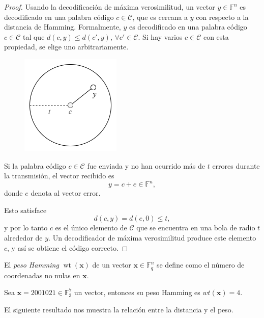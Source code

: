 \begin{proof}
    Usando la decodificación de máxima verosimilitud, un vector $y \in \mathbb{F}^n$ es decodificado en una palabra código $c  \in \mathcal{C}$, que es cercana a $y$ con respecto a la distancia de Hamming. Formalmente, $y$ es decodificado en una palabra código $c \in \mathcal{C}$ tal que $d(c,y) \leq d(c',y)$, $\forall c' \in \mathcal{C}$. Si hay varios $c \in \mathcal{C}$ con esta propiedad, se elige uno arbitrariamente.

    \begin{figure}
        \centering
        \includegraphics[scale=0.5]{figures/Diagrama_decodificacion_maxima_verosimilitud.png}
    \end{figure}

    Si la palabra código $c \in \mathcal{C}$ fue enviada y no han ocurrido más de $t$ errores durante la transmisión, el vector recibido es 
    \[
        y = c + e \in \mathbb{F}^n,
    \]
    donde $e$ denota al vector error.
    
    Esto satisface 
    \[
        d(c,y) = d(e,0) \leq t,
    \]
    y por lo tanto $c$ es el único elemento de $\mathcal{C}$ que se encuentra en una bola de radio $t$ alrededor de $y$. Un decodificador de máxima verosimilitud produce este elemento $c$, y así se obtiene el código correcto.
\end{proof}

\begin{definition}
    El \emph{peso Hamming} $\operatorname{wt}(\mathbf{x})$ de un vector $\mathbf{x} \in \mathbb{F}_q^n$ se define como el número de coordenadas no nulas en $\mathbf{x}$.
\end{definition}

\begin{exampleth}
    Sea $\mathbf{x} = 2001021 \in \mathbb{F}_3^7$ un vector, entonces su peso Hamming es $wt(\mathbf{x}) = 4$.
\end{exampleth}

El siguiente resultado nos muestra la relación entre la distancia y el peso.

